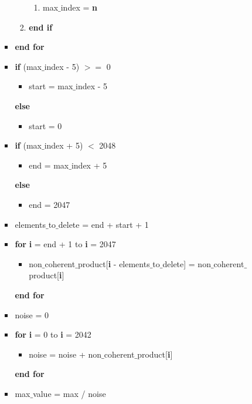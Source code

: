 \documentclass[journal,10pt,onecolumn]{article}
\begin{document}
\begin{enumerate}
\begin{enumerate}
\begin{itemize}
\begin{enumerate}
\begin{enumerate}
                    \item[] max$\_$index = \textbf{n}
                \end{enumerate}
               \item[] \textbf{end if}
            \end{enumerate}
            \item[] \textbf{end for} 
            \item[] \textbf{if} (max$\_$index - 5) $>=$ 0
            \begin{itemize}
                \item[] start = max$\_$index - 5
            \end{itemize}
            \textbf{else}
            \begin{itemize}
                \item[] start = 0
            \end{itemize}
            \item[] \textbf{if} (max$\_$index + 5) $<$ 2048
            \begin{itemize}
                \item[] end = max$\_$index + 5
            \end{itemize}
            \textbf{else}
            \begin{itemize}
                \item[] end = 2047
            \end{itemize}
            \item[] elements$\_$to$\_$delete = end + start + 1
            \item[] \textbf{for} \textbf{i} = end + 1 to \textbf{i} = 2047
            \begin{itemize}
                \item[] non$\_$coherent$\_$product[\textbf{i} - elements$\_$to$\_$delete] = non$\_$coherent$\_$product[\textbf{i}]
            \end{itemize}  
            \textbf{end for}
            \item[] noise = 0
            \item[] \textbf{for} \textbf{i} = 0 to \textbf{i} = 2042
            \begin{itemize}
                \item[] noise = noise + non$\_$coherent$\_$product[\textbf{i}]
            \end{itemize} 
            \textbf{end for}
            \item[] max$\_$value = max / noise 








\end{itemize}
\end{enumerate}
\end{enumerate}
\end{document}
